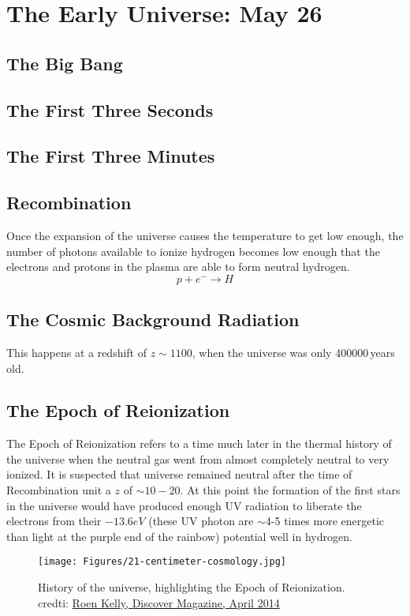 \section{The Early Universe: May 26}

\subsection{The Big Bang}

\subsection{The First Three Seconds}

\subsection{The First Three Minutes}

\subsection{Recombination}
Once the expansion of the universe causes the temperature to get low enough, the number of photons available to ionize hydrogen becomes low enough that the electrons and protons in the plasma are able to form neutral hydrogen.
\begin{equation}
p + e^- \longrightarrow H
\end{equation}

\subsection{The Cosmic Background Radiation}
This happens at a redshift of $z \sim 1100$, when the universe was only 400000\,years old.

\subsection{The Epoch of Reionization}
The Epoch of Reionization refers to a time much later in the thermal history of the universe when the neutral gas went from almost completely neutral to very ionized. It is suspected that
universe remained neutral after the time of Recombination unit a $z$ of $\sim 10-20$. At this point the formation of the first stars in the universe would have produced enough UV radiation to liberate the electrons from their $-13.6 eV$ (these UV photon are $\sim$4-5 times more energetic than light at the purple end of the rainbow) potential well in hydrogen. 
\begin{figure}[h]
\centering
\texttt{[image: Figures/21-centimeter-cosmology.jpg]}
\caption{History of the universe, highlighting the Epoch of Reionization.
credti: \href{http://discovermagazine.com/2014/april/12-first-light}{Roen Kelly, Discover Magazine, April 2014}}
\label{fig:EoR}
\end{figure}

